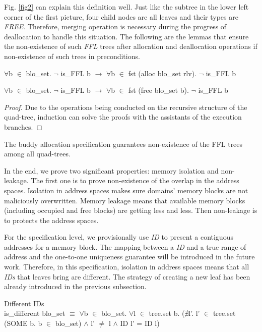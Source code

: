 \documentclass[runningheads]{llncs}
\begin{document}
Fig. \ref{fig2} can explain this definition well. Just like the subtree in the lower left corner of the first picture, four child nodes are all leaves and their types are \textsl{FREE}. Therefore, merging operation is necessary during the progress of deallocation to handle this situation. The following are the lemmas that ensure the non-existence of such \textsl{FFL} trees after allocation and deallocation operations if non-existence of such trees in preconditions.

\begin{lemma}
$\forall$b $\in$ blo\_set. $\neg$ is\_FFL b $\longrightarrow$ $\forall$b $\in$ fst (alloc blo\_set rlv). $\neg$ is\_FFL b
\end{lemma}

\begin{lemma}
$\forall$b $\in$ blo\_set. $\neg$ is\_FFL b $\longrightarrow$ $\forall$b $\in$ fst (free blo\_set b). $\neg$ is\_FFL b
\end{lemma}

\begin{proof}
Due to the operations being conducted on the recursive structure of the quad-tree, induction can solve the proofs with the assistants of the execution branches.
\end{proof}

\begin{theorem}
The buddy allocation specification guarantees non-existence of the FFL trees among all quad-trees.
\end{theorem}

In the end, we prove two significant properties: memory isolation and non-leakage. The first one is to prove non-existence of the overlap in the address spaces. Isolation in address spaces makes sure domains' memory blocks are not maliciously overwritten. Memory leakage means that available memory blocks (including occupied and free blocks) are getting less and less. Then non-leakage is to protects the address spaces.

For the specification level, we provisionally use \textsl{ID} to present a contiguous addresses for a memory block. The mapping between a \textsl{ID} and a true range of address and the one-to-one uniqueness guarantee will be introduced in the future work. Therefore, in this specification, isolation in address spaces means that all \textsl{IDs} that leaves bring are different. The strategy of creating a new leaf has been already introduced in the previous subsection.

\begin{definition} {Different IDs} \\
is\_different blo\_set $\equiv$ $\forall$b $\in$ blo\_set. $\forall$l $\in$ tree.set b. ($\nexists$l'. l' $\in$ tree.set (SOME b. b $\in$ blo\_set) $\wedge$ l' $\ne$ l $\wedge$ ID l' = ID l)
\end{definition}
\end{document}
